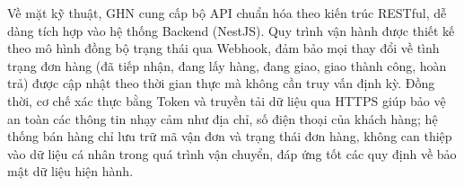 Về mặt kỹ thuật, GHN cung cấp bộ API chuẩn hóa theo kiến trúc RESTful, dễ dàng tích hợp vào hệ thống Backend (NestJS). Quy trình vận hành được thiết kế theo mô hình đồng bộ trạng thái qua Webhook, đảm bảo mọi thay đổi về tình trạng đơn hàng (đã tiếp nhận, đang lấy hàng, đang giao, giao thành công, hoàn trả) được cập nhật theo thời gian thực mà không cần truy vấn định kỳ. Đồng thời, cơ chế xác thực bằng Token và truyền tải dữ liệu qua HTTPS giúp bảo vệ an toàn các thông tin nhạy cảm như địa chỉ, số điện thoại của khách hàng; hệ thống bán hàng chỉ lưu trữ mã vận đơn và trạng thái đơn hàng, không can thiệp vào dữ liệu cá nhân trong quá trình vận chuyển, đáp ứng tốt các quy định về bảo mật dữ liệu hiện hành.\\